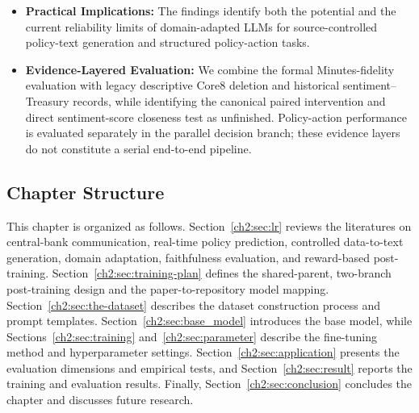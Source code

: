 \begin{itemize}
\item[] \textbf{Practical Implications:} The findings identify both the
potential and the current reliability limits of domain-adapted LLMs for
source-controlled policy-text generation and structured policy-action tasks.

\item[] \textbf{Evidence-Layered Evaluation:} We combine the formal
Minutes-fidelity evaluation with legacy descriptive Core8 deletion and
historical sentiment--Treasury records, while identifying the canonical
paired intervention and direct sentiment-score closeness test as unfinished.
Policy-action performance is evaluated separately in the parallel decision
branch; these evidence layers do not constitute a serial end-to-end pipeline.
\end{itemize}


\subsection*{Chapter Structure}

This chapter is organized as follows. Section~\ref{ch2:sec:lr} reviews the
literatures on central-bank communication, real-time policy prediction,
controlled data-to-text generation, domain adaptation, faithfulness
evaluation, and reward-based post-training. Section~\ref{ch2:sec:training-plan}
defines the shared-parent, two-branch post-training design and the
paper-to-repository model mapping. Section~\ref{ch2:sec:the-dataset} describes
the dataset construction process and prompt templates.
Section~\ref{ch2:sec:base_model} introduces the base model, while
Sections~\ref{ch2:sec:training} and~\ref{ch2:sec:parameter} describe the
fine-tuning method and hyperparameter settings.
Section~\ref{ch2:sec:application} presents the evaluation dimensions and
empirical tests, and Section~\ref{ch2:sec:result} reports the training and
evaluation results. Finally, Section~\ref{ch2:sec:conclusion} concludes the
chapter and discusses future research.
